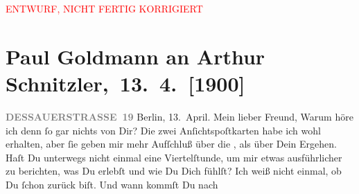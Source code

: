 
\begin{center}
            \textcolor{red}{ENTWURF, NICHT FERTIG KORRIGIERT}
                      \end{center}
            
         
         \renewcommand{\erwaehntePersonen}{Personen: Eberhard König, Agnes Sorma}
         \renewcommand{\erwaehnteOrte}{Orte: Berlin, Dessauer Straße, Frankfurt am Main, Lessing-Theater, Schauspielhaus, Wien}
         \renewcommand{\erwaehnteWerke}{Werke: Gevatter Tod. Ein Märchen von der Menschheit. Drama in fünf Aufzügen, Liebelei. Schauspiel in drei Akten}
               \section[ Paul Goldmann an Arthur Schnitzler, 13. 4. {[}1900{]}]{ Paul Goldmann an Arthur Schnitzler, 13. 4. {[}1900{]}}\nopagebreak{}\rehead{ }\begin{ledgroupsized}[t]{13cm}\normalsize\beginnumbering \toendnotes[C]{\smallbreak\pagebreak[2]} 
\toendnotes[C]{\smallbreak}\pstart{}{\pb}\textcolor{gray}{\textbf{DESSAUERSTRASSE 19}}\pend{}{\bigskip}\pstart
           \raggedleft{}Berlin, 13. April.\pend
           \pstart{}Mein lieber Freund,\pend\pstart
           Warum höre ich denn ſo gar nichts von Dir? Die zwei Anſichtspoſtkarten habe ich wohl
               erhalten, aber ſie geben mir mehr Aufſchluß über die \label{K_L02910-1v}\label{K_L02910-1h}, als über Dein Ergehen. Haſt Du unterwegs nicht einmal eine Viertelſtunde, um
               mir etwas ausführlicher zu berichten, was Du erlebſt und wie Du Dich fühlſt? Ich weiß
               nicht einmal, ob Du ſchon zurück biſt. Und wann kommſt Du nach \label{K_L02910-2v}
\end{ledgroupsized}

